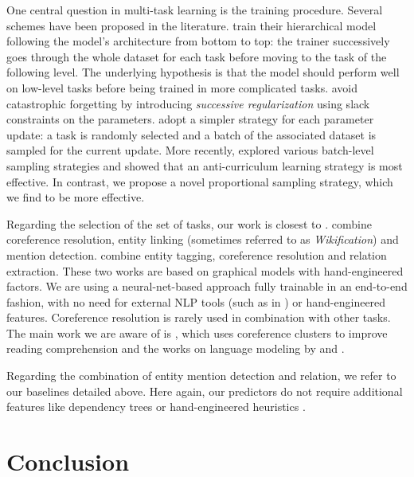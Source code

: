 \documentclass[letterpaper]{article} \usepackage{aaai19}  \usepackage{times}  \usepackage{helvet}  \usepackage{courier}  \usepackage{url}  \usepackage{graphicx}  \usepackage{todonotes}
\begin{document}
One central question in multi-task learning is the training procedure. Several schemes have been proposed in the literature. \citeauthor{Hashimoto2017}  train their hierarchical model following the model's architecture from bottom to top: the trainer successively goes through the whole dataset for each task before moving to the task of the following level. The underlying hypothesis is that the model should perform well on low-level tasks before being trained in more complicated tasks. \citeauthor{Hashimoto2017} avoid catastrophic forgetting by introducing \textit{successive regularization} using slack constraints on the parameters. \citeauthor{Subramanian2018}  adopt a simpler strategy for each parameter update: a task is randomly selected and a batch of the associated dataset is sampled for the current update. More recently, \citeauthor{Mccann2018}  explored various batch-level sampling strategies and showed that an anti-curriculum learning strategy \cite{Bengio2009} is most effective. In contrast, we propose a novel proportional sampling strategy, which we find to be more effective.

Regarding the selection of the set of tasks, our work is closest to \cite{Durrett2014,Singh2013}. \citeauthor{Durrett2014}  combine coreference resolution, entity linking (sometimes referred to as \textit{Wikification}) and mention detection. \citeauthor{Singh2013}  combine entity tagging, coreference resolution and relation extraction. These two works are based on graphical models with hand-engineered factors. We are using a neural-net-based approach fully trainable in an end-to-end fashion, with no need for external NLP tools (such as in \cite{Durrett2014}) or hand-engineered features. Coreference resolution is rarely used in combination with other tasks. The main work we are aware of is \cite{Dhingra2018}, which uses coreference clusters to improve reading comprehension and the works on language modeling by \citeauthor{Ji2017}  and \citeauthor{Yang2016lm} .

Regarding the combination of entity mention detection and relation, we refer to our baselines detailed above. Here again, our predictors do not require additional features like dependency trees \cite{Miwa2016} or hand-engineered heuristics \cite{Li2014}.

\section{Conclusion}
\end{document}

